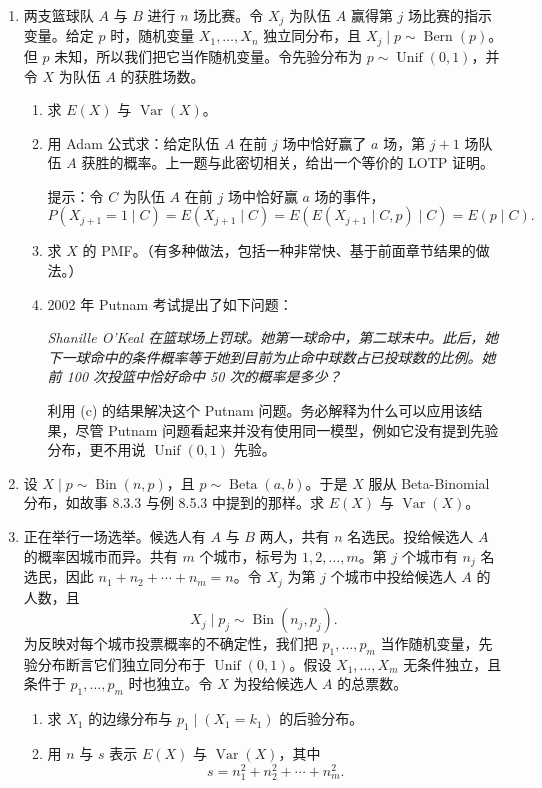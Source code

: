 \documentclass[UTF8,12pt,a4paper,fontset=fandol]{ctexart}
\begin{document}
\begin{enumerate}
  \item 两支篮球队 $A$ 与 $B$ 进行 $n$ 场比赛。令 $X_j$ 为队伍 $A$ 赢得第 $j$ 场比赛的指示变量。给定 $p$ 时，随机变量 $X_1,\ldots,X_n$ 独立同分布，且 $X_j\mid p\sim\operatorname{Bern}(p)$。但 $p$ 未知，所以我们把它当作随机变量。令先验分布为 $p\sim\operatorname{Unif}(0,1)$，并令 $X$ 为队伍 $A$ 的获胜场数。
  \begin{enumerate}
    \item[(a)] 求 $E(X)$ 与 $\operatorname{Var}(X)$。
    \item[(b)] 用 Adam 公式求：给定队伍 $A$ 在前 $j$ 场中恰好赢了 $a$ 场，第 $j+1$ 场队伍 $A$ 获胜的概率。上一题与此密切相关，给出一个等价的 LOTP 证明。

    \noindent 提示：令 $C$ 为队伍 $A$ 在前 $j$ 场中恰好赢 $a$ 场的事件，
    \[
      P(X_{j+1}=1\mid C)=E(X_{j+1}\mid C)
      =E(E(X_{j+1}\mid C,p)\mid C)=E(p\mid C).
    \]
    \item[(c)] 求 $X$ 的 PMF。（有多种做法，包括一种非常快、基于前面章节结果的做法。）
    \item[(d)] 2002 年 Putnam 考试提出了如下问题：

    \textit{Shanille O'Keal 在篮球场上罚球。她第一球命中，第二球未中。此后，她下一球命中的条件概率等于她到目前为止命中球数占已投球数的比例。她前 100 次投篮中恰好命中 50 次的概率是多少？}

    利用 (c) 的结果解决这个 Putnam 问题。务必解释为什么可以应用该结果，尽管 Putnam 问题看起来并没有使用同一模型，例如它没有提到先验分布，更不用说 $\operatorname{Unif}(0,1)$ 先验。
  \end{enumerate}

  \item 设 $X\mid p\sim\operatorname{Bin}(n,p)$，且 $p\sim\operatorname{Beta}(a,b)$。于是 $X$ 服从 Beta-Binomial 分布，如故事 8.3.3 与例 8.5.3 中提到的那样。求 $E(X)$ 与 $\operatorname{Var}(X)$。

  \item 正在举行一场选举。候选人有 $A$ 与 $B$ 两人，共有 $n$ 名选民。投给候选人 $A$ 的概率因城市而异。共有 $m$ 个城市，标号为 $1,2,\ldots,m$。第 $j$ 个城市有 $n_j$ 名选民，因此 $n_1+n_2+\cdots+n_m=n$。令 $X_j$ 为第 $j$ 个城市中投给候选人 $A$ 的人数，且
  \[
    X_j\mid p_j\sim\operatorname{Bin}(n_j,p_j).
  \]
  为反映对每个城市投票概率的不确定性，我们把 $p_1,\ldots,p_m$ 当作随机变量，先验分布断言它们独立同分布于 $\operatorname{Unif}(0,1)$。假设 $X_1,\ldots,X_m$ 无条件独立，且条件于 $p_1,\ldots,p_m$ 时也独立。令 $X$ 为投给候选人 $A$ 的总票数。
  \begin{enumerate}
    \item[(a)] 求 $X_1$ 的边缘分布与 $p_1\mid (X_1=k_1)$ 的后验分布。
    \item[(b)] 用 $n$ 与 $s$ 表示 $E(X)$ 与 $\operatorname{Var}(X)$，其中
    \[
      s=n_1^2+n_2^2+\cdots+n_m^2.
    \]
  \end{enumerate}
\end{enumerate}
\end{document}
